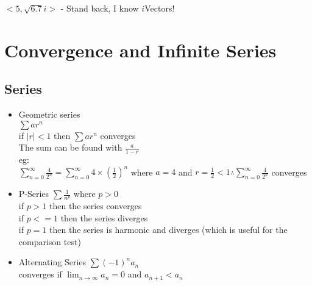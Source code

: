 \documentclass{article}
\begin{document}
\(<5,\sqrt{6.7}i>\) - Stand back, I know \(i\)Vectors!\\
\section*{\color{Gray}Convergence and Infinite Series}
  \subsection*{\color{BrickRed}Series}
  \begin{itemize}
    \item Geometric series\\
      \subitem \( \sum ar^n \) \\
      if \( |r|<1 \) then \( \sum ar^n \) converges\\
      The sum can be found with \(\frac{a}{1-r}\)\\
      \subitem eg:\\
      \( \sum\limits_{n=0}^{\infty} \frac {4} {2^n} =
      \sum\limits_{n=0}^{\infty} 4 \times (\frac {1} {2})^n \) where
      \(a=4\) and \(r=\frac {1} {2} < 1 \therefore \sum\limits_{n=0}^{\infty}
      \frac{4}{2^n} \) converges \\
    \item P-Series
      \subitem \( \sum \frac{1}{n^p}\) where
      \( p>0 \) \\
      if \(p>1\) then the series converges\\
      if \(p<=1\) then the series diverges\\
      if \(p=1\) then the series is harmonic and diverges (which is
      useful for the comparison test)\\
    \item Alternating Series
      \subitem \( \sum (-1)^n a_n \)\\
      converges if \( \lim_{n\rightarrow\infty} a_n=0 \) and \( a_{n+1}<a_n \)\\
  \end{itemize}
\end{document}
